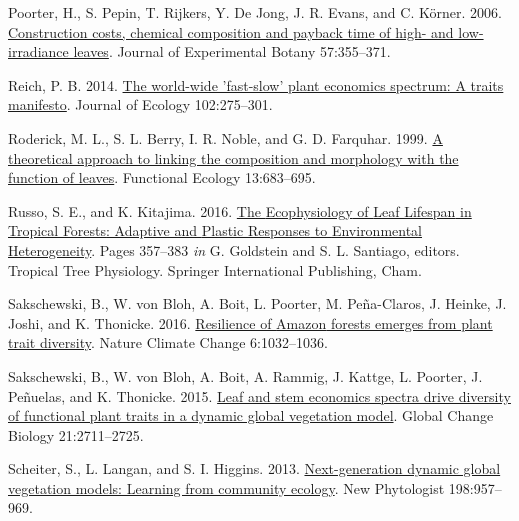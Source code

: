 \documentclass[
  12pt,
]{article}
\newlength{\cslhangindent} %
\newlength{\cslentryspacingunit} %
\newenvironment{CSLReferences}[2] %
 {%
  \setlength{\parindent}{0pt} %
  \ifodd #1 %
  \let\oldpar\par %
  \def\par{\hangindent=\cslhangindent\oldpar} %
  \fi %
  \setlength{\parskip}{#2\cslentryspacingunit} %
 }%
 {} %
\providecommand{\DIFdelbegin}{} %
\providecommand{\DIFdelend}{} %
\newcommand{\DIFscaledelfig}{0.5}
\newlength{\DIFdelgraphicswidth} %
\newlength{\DIFdelgraphicsheight} %
\newcommand{\DIFdelincludegraphics}[2][]{%
\sbox{\DIFdelgraphicsbox}{\DIFOincludegraphics[#1]{#2}}%
\settoboxwidth{\DIFdelgraphicswidth}{\DIFdelgraphicsbox} %
\settoboxtotalheight{\DIFdelgraphicsheight}{\DIFdelgraphicsbox} %
\scalebox{\DIFscaledelfig}{%
\parbox[b]{\DIFdelgraphicswidth}{\usebox{\DIFdelgraphicsbox}\\[-\baselineskip] \rule{\DIFdelgraphicswidth}{0em}}\llap{\resizebox{\DIFdelgraphicswidth}{\DIFdelgraphicsheight}{%
\setlength{\unitlength}{\DIFdelgraphicswidth}%
\begin{picture}(1,1)%
\thicklines\linethickness{2pt} %
{\color[rgb]{1,0,0}\put(0,0){\framebox(1,1){}}}%
{\color[rgb]{1,0,0}\put(0,0){\line( 1,1){1}}}%
{\color[rgb]{1,0,0}\put(0,1){\line(1,-1){1}}}%
\end{picture}%
}\hspace*{3pt}}} %
} %
\DeclareRobustCommand{\DIFdelbegin}{\DIFOdelbegin \let\includegraphics\DIFdelincludegraphics} %
\DeclareRobustCommand{\DIFdelend}{\DIFOaddend \let\includegraphics\DIFOincludegraphics} %
\begin{document}
\begin{CSLReferences}{1}{0}
\leavevmode{}%
Poorter, H., S. Pepin, T. Rijkers, Y. De Jong, J. R. Evans, and C. Körner. 2006. \href{https://doi.org/10.1093/jxb/erj002}{Construction costs, chemical composition and payback time of high- and low-irradiance leaves}. Journal of Experimental Botany 57:355--371.

\leavevmode{}%
Reich, P. B. 2014. \href{https://doi.org/10.1111/1365-2745.12211}{The world-wide 'fast-slow' plant economics spectrum: \DIFdelbegin %
\DIFdelend A \DIFdelbegin %
\DIFdelend traits manifesto}. Journal of Ecology 102:275--301.

\leavevmode{}%
Roderick, M. L., S. L. Berry, I. R. Noble, and G. D. Farquhar. 1999. \href{https://doi.org/10.1046/j.1365-2435.1999.00368.x}{A theoretical approach to linking the composition and morphology with the function of leaves}. Functional Ecology 13:683--695.

\leavevmode{}%
Russo, S. E., and K. Kitajima. 2016. \href{https://doi.org/10.1007/978-3-319-27422-5_17}{The {Ecophysiology} of {Leaf Lifespan} in {Tropical Forests}: \DIFdelbegin %
\DIFdelend Adaptive \DIFdelbegin %
\DIFdelend and {Plastic Responses} to {Environmental Heterogeneity}}. Pages 357--383 \emph{in} G. Goldstein and S. L. Santiago, editors. Tropical {Tree Physiology}. {Springer International Publishing}, {Cham}.

\leavevmode{}%
Sakschewski, B., W. von Bloh, A. Boit, L. Poorter, M. Peña-Claros, J. Heinke, J. Joshi, and K. Thonicke. 2016. \href{https://doi.org/10.1038/nclimate3109}{Resilience of {Amazon} forests emerges from plant trait diversity}. Nature Climate Change 6:1032--1036.

\leavevmode{}%
Sakschewski, B., W. von Bloh, A. Boit, A. Rammig, J. Kattge, L. Poorter, J. Peñuelas, and K. Thonicke. 2015. \href{https://doi.org/10.1111/gcb.12870}{Leaf and stem economics spectra drive diversity of functional plant traits in a dynamic global vegetation model}. Global Change Biology 21:2711--2725.

\leavevmode{}%
Scheiter, S., L. Langan, and S. I. Higgins. 2013. \href{https://doi.org/10.1111/nph.12210}{Next-generation dynamic global vegetation models: \DIFdelbegin %
\DIFdelend Learning \DIFdelbegin %
\DIFdelend from community ecology}. New Phytologist 198:957--969.


\end{CSLReferences}
\end{document}
